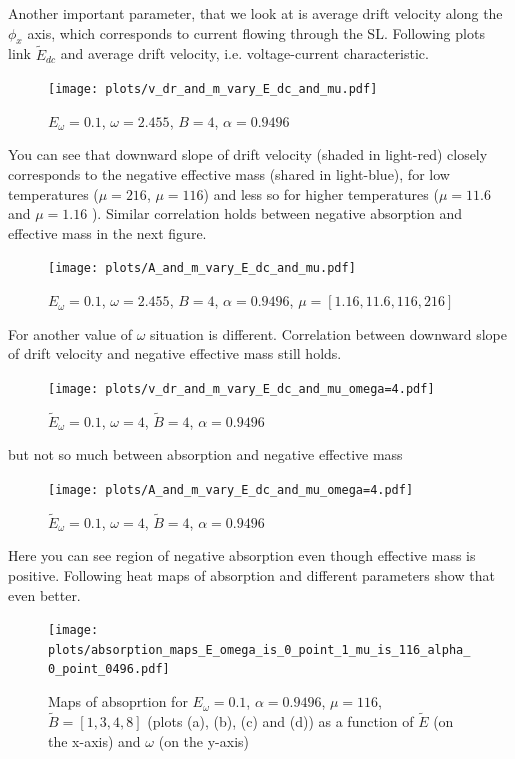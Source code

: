 \documentclass[40pt,letterpaper,physrev]{article}
\begin{document}
    Another important parameter, that we look at is average drift velocity along the $\phi_x$ axis, which corresponds 
    to current flowing through the SL. Following plots link $\tilde{E}_{dc}$ and average drift velocity, i.e. 
    voltage-current characteristic.
   	\begin{figure}[H]
	  \centering
	  \normalsize %
	  \texttt{[image: plots/v\_dr\_and\_m\_vary\_E\_dc\_and\_mu.pdf]}
	  \caption{$E_\omega=0.1$, $\omega=2.455$, $B=4$, $\alpha=0.9496$}
	  \label{fig:effect_of_temperature_in_v_dr_vary_E_dc_omega=2.455}	  
	\end{figure}	
	You can see that downward slope of drift velocity (shaded in light-red) closely corresponds to the negative effective
	mass (shared in light-blue), for low temperatures ($\mu = 216$, $\mu = 116$) and less so for higher 
	temperatures ($\mu = 11.6$ and $\mu = 1.16$ ). Similar correlation holds between negative absorption and effective
	mass in the next figure.
	\begin{figure}[H]
	  \centering
	  \normalsize %
	  \texttt{[image: plots/A\_and\_m\_vary\_E\_dc\_and\_mu.pdf]}
	  \caption{$E_\omega=0.1$, $\omega=2.455$, $B=4$, $\alpha=0.9496$, $\mu=[1.16, 11.6, 116, 216]$}
	  \label{fig:effect_of_temperature_in_A_vary_E_dc_omega=2.455}
	\end{figure}	
	For another value of $\omega$ situation is different. Correlation between downward slope of drift velocity and 
	negative effective mass still holds.
	\begin{figure}[H]
	  \centering
	  \normalsize %
	  \texttt{[image: plots/v\_dr\_and\_m\_vary\_E\_dc\_and\_mu\_omega=4.pdf]}
	  \caption{$\tilde{E}_\omega=0.1$, $\omega=4$, $\tilde{B}=4$, $\alpha=0.9496$}
	  \label{fig:effect_of_temperature_in_v_dr_vary_E_dc_omega=4}	  
	\end{figure}
	but not so much between absorption and negative effective mass
	\begin{figure}[H]
	  \centering
	  \normalsize %
	  \texttt{[image: plots/A\_and\_m\_vary\_E\_dc\_and\_mu\_omega=4.pdf]}
	  \caption{$\tilde{E}_\omega=0.1$, $\omega=4$, $\tilde{B}=4$, $\alpha=0.9496$}
	  \label{fig:effect_of_temperature_in_A_vary_E_dc_omega=4}
	\end{figure}
	Here you can see region of negative absorption even though effective mass is positive. Following heat maps of
absorption and different parameters show that even better.
	\begin{figure}[H]
	  \centering
	  \normalsize %
	  \texttt{[image: plots/absorption\_maps\_E\_omega\_is\_0\_point\_1\_mu\_is\_116\_alpha\_0\_point\_0496.pdf]}
	  \caption{Maps of absoprtion for $E_\omega=0.1$, $\alpha=0.9496$, $\mu=116$, $\tilde{B}=[1,3,4,8]$ 
	  (plots (a), (b), (c) and (d)) as a function of $\tilde{E}$ (on the x-axis) and $\omega$ (on the y-axis)}
	  \label{fig:absorption}	  
	\end{figure}
\end{document}
